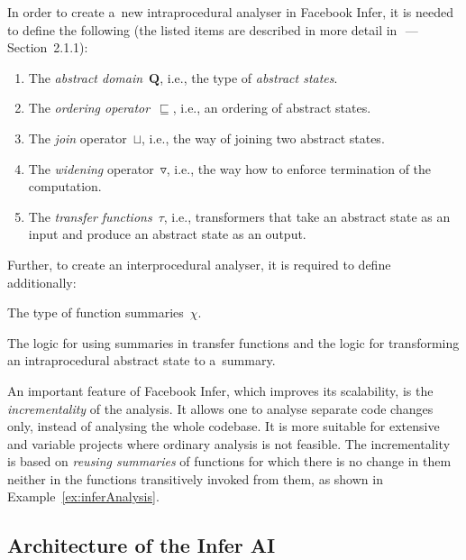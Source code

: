 \documentclass{ExcelAtFIT}
\theoremstyle{definition}
\begin{document}
In order to create a~new intraprocedural analyser in Facebook Infer, it is needed to define the following (the listed items are described in more detail in~\cite{harmimBP}\,---\,Section~2.1.1):
\begin{enumerate}
    \item The \emph{abstract domain}~$ \boldsymbol{Q} $, i.e., the type of \emph{abstract states}.

    \item The \emph{ordering operator}~$ \sqsubseteq $, i.e., an ordering of abstract states.

    \item The \emph{join} operator~$ \sqcup $, i.e., the way of joining two abstract states.

    \item The \emph{widening} operator~$ \triangledown $, i.e., the way how to enforce termination of the computation.

    \item The \emph{transfer functions}~$ \tau $, i.e., transformers that take an abstract state as an input and produce an abstract state as an output.
\end{enumerate}
Further, to create an interprocedural analyser, it is required to define additionally:
\begin{enumerate*}[label={(\roman*)}]
    \item The type of function summaries~$ \chi $.

    \item The logic for using summaries in transfer functions and the logic for transforming an intraprocedural abstract state to a~summary.
\end{enumerate*}

An important feature of Facebook Infer, which improves its scalability, is the \emph{incrementality} of the analysis. It allows one to analyse separate code changes only, instead of analysing the whole codebase. It is more suitable for extensive and variable projects where ordinary analysis is not feasible. The incrementality is based on \emph{reusing summaries} of functions for which there is no change in them neither in the functions transitively invoked from them, as shown in Example~\ref{ex:inferAnalysis}.

\subsection{Architecture of the Infer AI}
\label{sec:fbinferArch}
\end{document}
